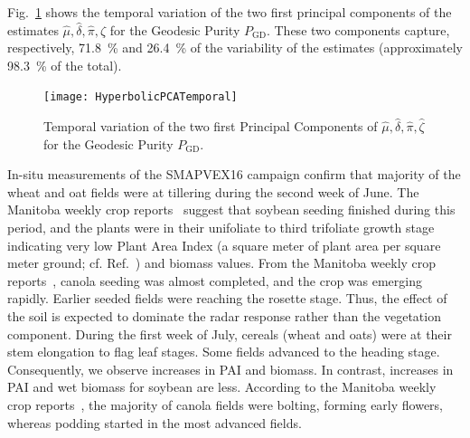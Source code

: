 \documentclass[journal]{IEEEtran}
\begin{document}
{Fig.~\ref{Fig:PCAPurityTemporal} shows the temporal variation of the two first principal components of the estimates $\widehat \mu,\widehat \delta, \widehat \pi, \widehat \zeta$ for the Geodesic Purity $P_{\text{GD}}$.
These two components capture, respectively, \SI{71.8}{\percent} and \SI{26.4}{\percent} of the variability of the estimates (approximately \SI{98.3}{\percent} of the total).

\begin{figure}[hbt]
\centering
\texttt{[image: HyperbolicPCATemporal]}
	\caption{Temporal variation of the two first Principal Components of $\widehat \mu,\widehat \delta, \widehat \pi, \widehat \zeta$ for the Geodesic Purity $P_{\text{GD}}$.}\label{Fig:PCAPurityTemporal}
\end{figure}

In-situ measurements of the SMAPVEX16 campaign confirm that majority of the wheat and oat fields were at tillering during the second week of June. 
The Manitoba weekly crop reports~\cite{manitobaagriculture} suggest that soybean seeding finished during this period, and the plants were in their unifoliate to third trifoliate growth stage indicating very low Plant Area Index (a square meter of plant area per square meter ground; cf. Ref.~\cite{TheArchitectureofaDeciduousForestCanopyinEasternTennessee}) and biomass values. 
From the Manitoba weekly crop reports~\cite{manitobaagriculture}, canola seeding was almost completed, and the crop was emerging rapidly. 
Earlier seeded fields were reaching the rosette stage. 
Thus, the effect of the soil is expected to dominate the radar response rather than the vegetation component.
During the first week of July, cereals (wheat and oats) were at their stem elongation to flag leaf stages. Some fields advanced to the heading stage. Consequently, we observe increases in PAI and biomass. 
In contrast, increases in PAI and wet biomass for soybean are less. 
According to the Manitoba weekly crop reports~\cite{manitobaagriculture}, the majority of canola fields were bolting, forming early flowers, whereas podding started in the most advanced fields.

}
\end{document}
